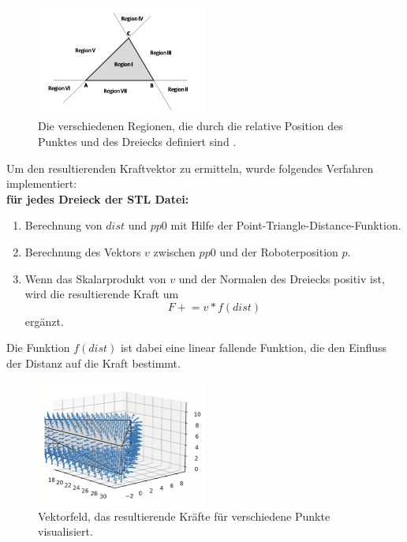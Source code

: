 \documentclass[conference]{IEEEtran}
\begin{document}
\begin{figure}[h]
    \centering
    \includegraphics[width=0.5\textwidth]{pics/regions.png}
    \caption{Die verschiedenen Regionen, die durch die relative Position des Punktes und des Dreiecks definiert sind \cite{regionen}.}
    \label{fig:regions}
\end{figure}
\begin{samepage}
    Um den resultierenden Kraftvektor zu ermitteln, wurde folgendes Verfahren implementiert: \\
    \textbf{für jedes Dreieck der STL Datei:}
    \begin{enumerate}
        \item Berechnung von $dist$ und $pp0$ mit Hilfe der Point-Triangle-Distance-Funktion.
        \item Berechnung des Vektors $v$ zwischen $pp0$ und der Roboterposition $p$.
        \item Wenn das Skalarprodukt von $v$ und der Normalen des Dreiecks positiv ist, wird die resultierende Kraft um
        \begin{equation*}
            F \mathrel{+}= v * f(dist)
        \end{equation*}
        ergänzt. 
    \end{enumerate}
    Die Funktion $f(dist)$ ist dabei eine linear fallende Funktion, die den Einfluss der Distanz auf die Kraft bestimmt.
\end{samepage}

\begin{figure}[h]
    \centering
    \includegraphics[width=0.5\textwidth]{pics/vectorfield.png}
    \caption{Vektorfeld, das resultierende Kräfte für verschiedene Punkte visualisiert.}
    \label{fig:vectorfield}
\end{figure}
\end{document}
